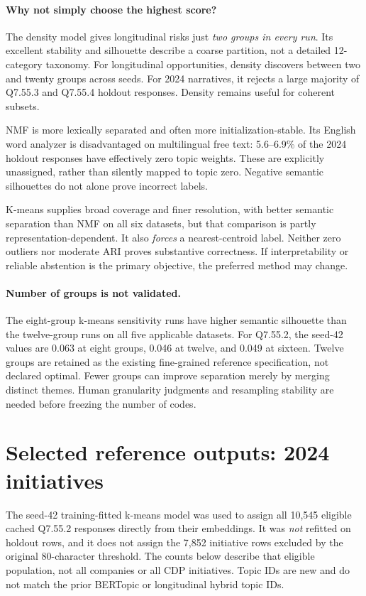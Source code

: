 \documentclass[11pt,a4paper]{article}
\begin{document}
\paragraph{Why not simply choose the highest score?}
The density model gives longitudinal risks just \emph{two groups in every
run}. Its excellent stability and silhouette describe a coarse partition,
not a detailed 12-category taxonomy. For longitudinal opportunities,
density discovers between two and twenty groups across seeds.
For 2024 narratives, it rejects a large majority of Q7.55.3 and Q7.55.4
holdout responses. Density remains useful for coherent subsets.

NMF is more lexically separated and often more initialization-stable.
Its English word analyzer is disadvantaged on multilingual free text:
5.6--6.9\% of the 2024 holdout responses have effectively zero topic weights.
These are explicitly unassigned, rather than silently mapped to topic zero.
Negative semantic silhouettes do not alone prove incorrect labels.

K-means supplies broad coverage and finer resolution, with better semantic
separation than NMF on all six datasets, but that comparison is partly
representation-dependent. It also \emph{forces} a nearest-centroid label.
Neither zero outliers nor moderate ARI proves substantive correctness.
If interpretability or reliable abstention is the primary objective,
the preferred method may change.

\paragraph{Number of groups is not validated.}
The eight-group k-means sensitivity runs have higher semantic silhouette
than the twelve-group runs on all five applicable datasets. For Q7.55.2,
the seed-42 values are 0.063 at eight groups, 0.046 at twelve, and 0.049
at sixteen. Twelve groups are retained as the existing fine-grained
reference specification, not declared optimal. Fewer groups can improve
separation merely by merging distinct themes. Human granularity judgments
and resampling stability are needed before freezing the number of codes.

\section{Selected reference outputs: 2024 initiatives}
The seed-42 training-fitted k-means model was used to assign all 10,545
eligible cached Q7.55.2 responses directly from their embeddings.
It was \emph{not} refitted on holdout rows, and it does not assign the
7,852 initiative rows excluded by the original 80-character threshold.
The counts below describe that eligible population, not all companies
or all CDP initiatives. Topic IDs are new and do not match the prior
BERTopic or longitudinal hybrid topic IDs.
\end{document}
